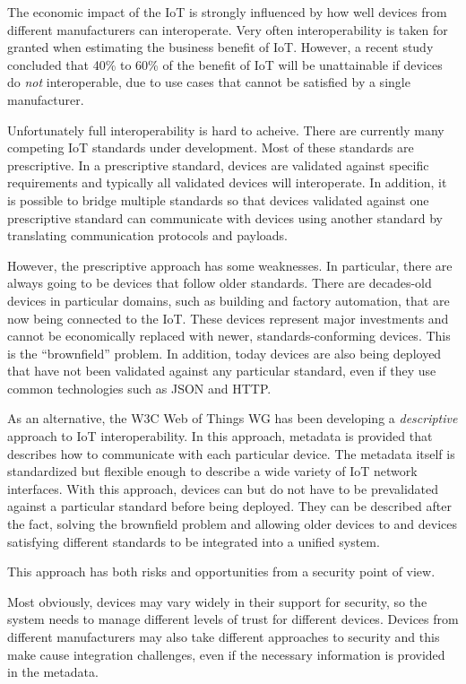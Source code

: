 The economic impact of the IoT is strongly influenced by how well devices from 
different manufacturers can interoperate.
Very often interoperability is taken for granted when estimating the business
benefit of IoT. 
However, a recent study \cite{McKinley2015}
concluded that 40\% to 60\% of the 
benefit of IoT will be unattainable if devices do \emph{not} interoperable,
due to use cases that cannot be satisfied by a single manufacturer.

Unfortunately full interoperability is hard to acheive.
There are currently many competing IoT standards under development.
Most of these standards are prescriptive.
In a prescriptive standard, devices are validated against specific requirements
and typically all validated devices will interoperate.
In addition, it is possible to bridge multiple standards so that
devices validated against one prescriptive standard can communicate with
devices using another standard by translating communication protocols and payloads.

However, the prescriptive approach has some weaknesses.
In particular, there are always going to be devices that follow older standards.
There are decades-old devices in particular domains, such as building and factory
automation, that are now being connected to the IoT.
These devices represent major investments and cannot be economically replaced with newer,
standards-conforming devices.  This is the ``brownfield'' problem.
In addition, today devices are also being deployed that have not been validated
against any particular standard,
even if they use common technologies such as JSON and HTTP.

As an alternative, the W3C Web of Things WG has been developing a \emph{descriptive} 
approach to IoT interoperability.
In this approach,
metadata is provided that describes how to communicate with each particular device.
The metadata itself is standardized but flexible enough to describe a wide variety of
IoT network interfaces.
With this approach, devices can but do not have to be prevalidated against 
a particular standard before being deployed.
They can be described after the fact,
solving the brownfield problem and allowing
older devices to and devices satisfying different standards to be integrated into
a unified system.  

This approach has both risks and opportunities from a security point of view.

Most obviously, devices may vary widely in their support for security,
so the system needs to manage different levels of trust for different devices.
Devices from different manufacturers may also take different approaches to
security and this make cause integration challenges, even if the necessary
information is provided in the metadata.

